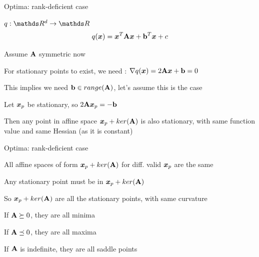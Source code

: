 \documentclass[11pt,compress,t,notes=noshow, xcolor=table]{beamer}
\begin{document}
\begin{framei}[fs=footnotesize]{Optima: rank-deficient case}
\item $q: \R^d \to \R$
$$ q(\bm{x}) = \bm{x}^T \mathbf{A} \bm{x} + \mathbf{b}^T \bm{x} + c $$
\item Assume $\mathbf{A}$ symmetric now
\item For stationary points to exist, we need : $\nabla q(\bm{x}) = 2 \mathbf{A} \bm{x} + \mathbf{b} = 0$
\item This implies we need $\mathbf{b} \in range(\mathbf{A})$, let's assume this is the case
\item Let $\bm{x}_p$ be stationary, so $2 \mathbf{A} \bm{x}_p = -\mathbf{b}$
\item Then any point in affine space $\bm{x}_p + ker(\mathbf{A})$ is also stationary, with same function value and same Hessian (as it is constant)
\end{framei}


\begin{framei}[fs=footnotesize]{Optima: rank-deficient case}
\item All affine spaces of form $\bm{x}_p + ker(\mathbf{A})$ for diff. valid $\bm{x}_p$ are the same
\item Any stationary point must be in $\bm{x}_p + ker(\mathbf{A})$
\item So $\bm{x}_p + ker(\mathbf{A})$ are all the stationary points, with same curvature
\item If $\mathbf{A} \succeq 0$, they are all minima
\item If $\mathbf{A} \preceq 0$, they are all maxima
\item If $\mathbf{A}$ is indefinite, they are all saddle points
\end{framei}

\endlecture
\end{document}
